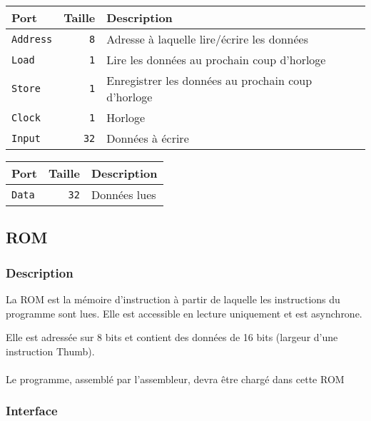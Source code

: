 
\begin{tabular}{|l|r|l|}
\hline
\textbf{Port}		& \textbf{Taille} & \textbf{Description}\\
\hline

\texttt{Address}	&  \texttt{8} & Adresse à laquelle lire/écrire les données\\
\hline
\texttt{Load}		&  \texttt{1} & Lire les données au prochain coup d'horloge\\
\hline
\texttt{Store}		&  \texttt{1} & Enregistrer les données au prochain coup d'horloge\\
\hline
\texttt{Clock}		&  \texttt{1} & Horloge\\
\hline
\texttt{Input}		&  \texttt{32} & Données à écrire\\


\hline
\end{tabular}


\begin{tabular}{|l|r|l|}
\hline 
\textbf{Port} & \textbf{Taille} & \textbf{Description}\\
\hline
\texttt{Data}		& \texttt{32} & Données lues\\

\hline
\end{tabular}


\subsection{ROM}

\subsubsection{Description}

La ROM est la mémoire d'instruction à partir de laquelle les instructions du programme sont lues. Elle est accessible en lecture uniquement et est asynchrone.

Elle est adressée sur 8 bits et contient des données de 16 bits (largeur d'une instruction Thumb).

\paragraph{}
Le programme, assemblé par l'assembleur, devra être chargé dans cette ROM

\subsubsection{Interface}

